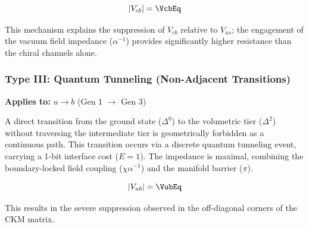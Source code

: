 \begin{equation}
|V_{cb}| = \VcbEq
\end{equation}

This mechanism explains the suppression of $V_{cb}$ relative to $V_{us}$; the engagement of the vacuum field impedance ($\alpha^{-1}$) provides significantly higher resistance than the chiral channels alone.

\subsubsection{Type III: Quantum Tunneling (Non-Adjacent Transitions)}
\textbf{Applies to:} $u \to b$ (Gen 1 $\to$ Gen 3)

A direct transition from the ground state ($\Delta^0$) to the volumetric tier ($\Delta^2$) without traversing the intermediate tier is geometrically forbidden as a continuous path. This transition occurs via a discrete quantum tunneling event, carrying a 1-bit interface cost ($E=1$). The impedance is maximal, combining the boundary-locked field coupling ($\chi\alpha^{-1}$) and the manifold barrier ($\pi$).

\begin{equation}
|V_{ub}| = \VubEq
\end{equation}

This results in the severe suppression observed in the off-diagonal corners of the CKM matrix.



